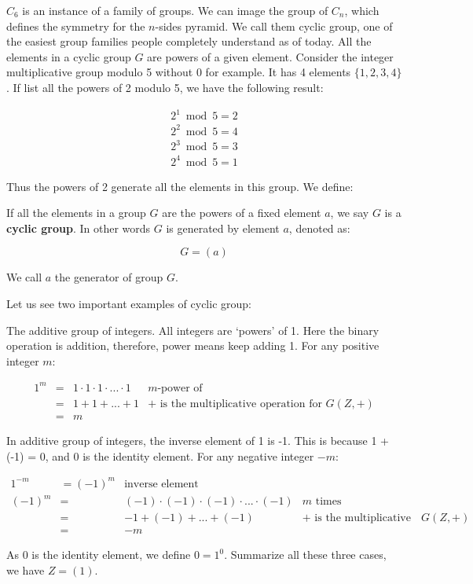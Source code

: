 \documentclass[b5paper]{article}
\begin{document}
$C_6$ is an instance of a family of groups. We can image the group of $C_n$, which defines the symmetry for the $n$-sides pyramid. We call them cyclic group, one of the easiest group families people completely understand as of today. All the elements in a cyclic group $G$ are powers of a given element. Consider the integer multiplicative group modulo 5 without 0 for example. It has 4 elements $\{1, 2, 3, 4\}$. If list all the powers of 2 modulo 5, we have the following result:

\[
\begin{array}{l}
2^1 \bmod 5 = 2 \\
2^2 \bmod 5 = 4 \\
2^3 \bmod 5 = 3 \\
2^4 \bmod 5 = 1
\end{array}
\]

Thus the powers of 2 generate all the elements in this group. We define:

\begin{definition}
If all the elements in a group $G$ are the powers of a fixed element $a$, we say $G$ is a \textbf{cyclic group}. In other words $G$ is generated by element $a$, denoted as:

\[
G = (a)
\]

We call $a$ the generator of group $G$.
\end{definition}

Let us see two important examples of cyclic group:

\begin{example}
The additive group of integers. All integers are `powers' of 1. Here the binary operation is addition, therefore, power means keep adding 1. For any positive integer $m$:

\[
\begin{array}{rcll}
1^m & = & 1 \cdot 1 \cdot 1 \cdot ... \cdot 1 & \text{$m$-power of} \\
    & = & 1 + 1 + ... + 1 & \text{+ is the multiplicative operation for $G(Z, +)$} \\
    & = & m &
\end{array}
\]

In additive group of integers, the inverse element of 1 is -1. This is because 1 + (-1) = 0, and 0 is the identity element. For any negative integer $-m$:

\[
\begin{array}{rcll}
1^{-m} & = (-1)^m & \text{inverse element} & \\
(-1)^m & = & (-1) \cdot (-1) \cdot (-1) \cdot ... \cdot (-1) & \text{$m$ times} \\
       & = & -1 + (-1) + ... + (-1) & \text{+ is the multiplicative operation for $G(Z, +)$} \\
       & = & -m &
\end{array}
\]

As 0 is the identity element, we define $0 = 1^0$. Summarize all these three cases, we have $Z = (1)$.
\end{example}
\end{document}
